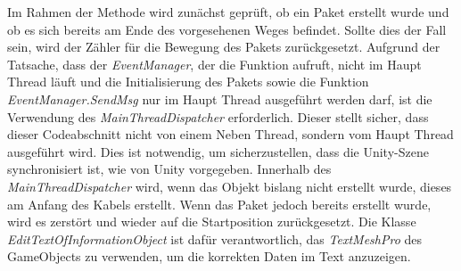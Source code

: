 Im Rahmen der Methode wird zunächst geprüft, ob ein Paket erstellt wurde und ob es sich bereits am Ende des vorgesehenen Weges befindet. Sollte dies der Fall sein, wird der Zähler für die Bewegung des Pakets zurückgesetzt. Aufgrund der Tatsache, dass der \textit{EventManager}, der die Funktion aufruft, nicht im Haupt Thread läuft und die Initialisierung des Pakets sowie die Funktion \textit{EventManager.SendMsg} nur im Haupt Thread ausgeführt werden darf, ist die Verwendung des \textit{MainThreadDispatcher} erforderlich. Dieser stellt sicher, dass dieser Codeabschnitt nicht von einem Neben Thread, sondern vom Haupt Thread ausgeführt wird. Dies ist notwendig, um sicherzustellen, dass die Unity-Szene synchronisiert ist, wie von Unity vorgegeben. Innerhalb des \textit{MainThreadDispatcher} wird, wenn das Objekt bislang nicht erstellt wurde, dieses am Anfang des Kabels erstellt. Wenn das Paket jedoch bereits erstellt wurde, wird es zerstört und wieder auf die Startposition zurückgesetzt. Die Klasse \textit{EditTextOfInformationObject} ist dafür verantwortlich, das \textit{TextMeshPro} des GameObjects zu verwenden, um die korrekten Daten im Text anzuzeigen.


